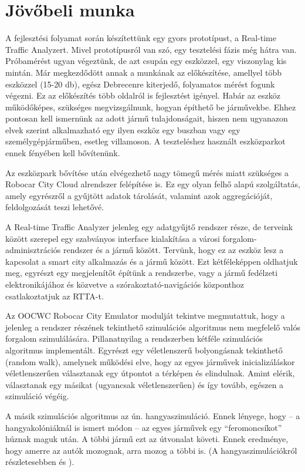 \documentclass[a4paper,12pt]{report}
\begin{document}
\chapter{Jövőbeli munka}
\label{futureworks}

A fejlesztési folyamat során készítettünk egy gyors prototípust, a Real-time Traffic Analyzert. Mivel prototípusról van szó, egy tesztelési fázis még hátra van. Próbamérést ugyan végeztünk, de azt csupán egy eszközzel, egy viszonylag kis mintán. Már megkezdődött annak a munkának az előkészítése, amellyel több eszközzel (15-20 db), egész Debrecenre kiterjedő, folyamatos mérést fogunk végezni. Ez az előkészítés több oldalról is fejlesztést igényel. Habár az eszköz működőképes, szükséges megvizsgálnunk, hogyan építhető be járművekbe. Ehhez pontosan kell ismernünk az adott jármű tulajdonságait, hiszen nem ugyanazon elvek szerint alkalmazható egy ilyen eszköz egy buszban vagy egy személygépjárműben, esetleg villamoson. A teszteléshez használt eszközparkot ennek fényében kell bővítenünk.

Az eszközpark bővítése után elvégezhető nagy tömegű mérés miatt szükséges a Robocar City Cloud alrendszer felépítése is. Ez egy olyan felhő alapú szolgáltatás, amely egyrészről a gyűjtött adatok tárolását, valamint azok aggregációját, feldolgozását teszi lehetővé.

A Real-time Traffic Analyzer jelenleg egy adatgyűjtő rendszer része, de terveink között szerepel egy szabványos interface kialakítása a városi forgalom-adminisztrációs rendszer és a jármű között. Tervünk, hogy ez az eszköz lesz a kapcsolat a smart city alkalmazás és a jármű között. Ezt kétféleképpen oldhatjuk meg, egyrészt egy megjelenítőt építünk a rendszerbe, vagy a jármű fedélzeti elektronikájához és közvetve a szórakoztató-navigációs központhoz csatlakoztatjuk az RTTA-t.

Az OOCWC Robocar City Emulator modulját tekintve megmutattuk, hogy a jelenleg a rendszer részének tekinthető szimulációs algoritmus nem megfelelő valós forgalom szimulálására. Pillanatnyilag a rendszerben kétféle szimulációs algoritmus implementált. Egyrészt egy véletlenszerű bolyongásnak tekinthető (random walk), amelynek működési elve, hogy az egyes járművek inicializáláskor véletlenszerűen választanak egy útpontot a térképen és elindulnak. Amint elérik, választanak egy másikat (ugyancsak véletlenszerűen) és így tovább, egészen a szimuláció végéig. 

A másik szimulációs algoritmus az ún. hangyaszimuláció. Ennek lényege, hogy -- a hangyakolóniáknál is ismert módon -- az egyes járművek egy ``feromoncsíkot'' húznak maguk után. A többi jármű ezt az útvonalat követi. Ennek eredménye, hogy amerre az autók mozognak, arra mozog a többi is. (A hangyaszimulációkról részletesebben \cite{ant1} és \cite{ant2}).
\end{document}
